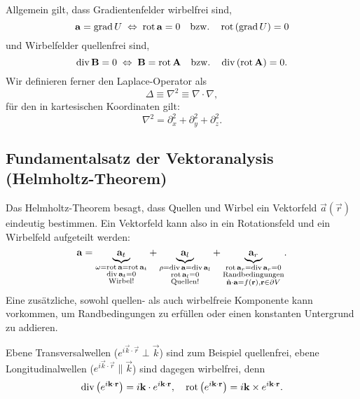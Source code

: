 Allgemein gilt, dass Gradientenfelder wirbelfrei sind,
\begin{equation*}
	\mathbf{a}=\operatorname{grad} U\;\Leftrightarrow\; \operatorname{rot} \mathbf{a}=0\quad\mathrm{bzw.}\quad  \operatorname{rot} \left(\operatorname{grad} U\right)=0
\end{equation*}
und Wirbelfelder quellenfrei sind,
\begin{equation*}
	\operatorname{div} \mathbf{B}=0\;\Leftrightarrow\; \mathbf{B}=\operatorname{rot} \mathbf{A}\quad\mathrm{bzw.}\quad  \operatorname{div} \left(\operatorname{rot} \mathbf{A}\right)=0.
\end{equation*}
Wir definieren ferner den Laplace-Operator als
\begin{equation*}
	\Delta  \equiv \nabla ^{2}\equiv \nabla \cdot \nabla ,
\end{equation*}
für den in kartesischen Koordinaten gilt:
\begin{equation*}
	\nabla ^{2}=\partial _{x}^{2}+\partial _{y}^{2}+\partial _{z}^{2}.
\end{equation*}
\subsection{Fundamentalsatz der Vektoranalysis (Helmholtz-Theorem)\label{ref-009}}

Das Helmholtz-Theorem besagt, dass Quellen und Wirbel ein Vektorfeld $\vec {a}\left(\vec {r}\right)$ eindeutig bestimmen. Ein Vektorfeld kann also in ein Rotationsfeld und ein Wirbelfeld aufgeteilt werden:
\begin{equation*}
	\mathbf{a}=\underset{\substack{
			\omega =\operatorname{rot} \mathbf{a}=\operatorname{rot} \mathbf{a}_{t} \\
			\operatorname{div} \mathbf{a}_{t}=0 \\
			\text{Wirbel}!
		}}{\underbrace{\mathbf{a}_{t}}}+\underset{\substack{
			\rho =\operatorname{div} \mathbf{a}=\operatorname{div} \mathbf{a}_{l} \\
			\operatorname{rot} \mathbf{a}_{l}=0                     \\
			\text{Quellen}!
		}}{\underbrace{\mathbf{a}_{l}}}+\underset{\substack{
			\operatorname{rot} \mathbf{a}_{r}=\operatorname{div} \mathbf{a}_{r}=0 \\
			\text{Randbedingungen}                 \\
			\hat{\mathbf{n }}\cdot \mathbf{a}=f\left(\mathbf{r}\right),\mathbf{r}\in \partial V
		}}{\underbrace{\mathbf{a}_{r}}}.
\end{equation*}
Eine zusätzliche, sowohl quellen- als auch wirbelfreie Komponente kann vorkommen, um Randbedingungen zu erfüllen oder einen konstanten Untergrund zu addieren.

Ebene Transversalwellen ($e^{i\vec {k}\cdot \vec {r}}\perp \vec {k}$) sind zum Beispiel quellenfrei, ebene Longitudinalwellen ($e^{i\vec {k}\cdot \vec {r}}\parallel \vec {k}$) sind dagegen wirbelfrei, denn
\begin{equation*}
	\operatorname{div} \left(e^{i\mathbf{k}\cdot \mathbf{r}}\right)=i\mathbf{k}\cdot e^{i\mathbf{k}\cdot \mathbf{r}},\quad \operatorname{rot} \left(e^{i\mathbf{k}\cdot \mathbf{r}}\right)=i\mathbf{k}\times e^{i\mathbf{k}\cdot \mathbf{r}}.
\end{equation*}




